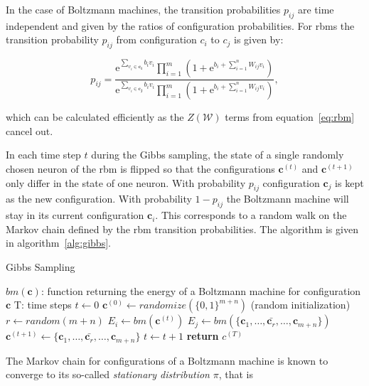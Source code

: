 In the case of Boltzmann machines, the transition probabilities $p_{ij}$ are time independent and 
given by the ratios of configuration probabilities. For \gls{rbm}s the transition probability $p_{ij}$ 
from configuration $c_i$ to $c_j$ is given by:

\begin{equation}
    p_{ij} = \frac{\mathrm{e}^{\sum_{v_i \in \bm{c_i}}b_iv_i}\prod_{i=1}^m(1+\mathrm{e}^{b_i + \sum_{i=1}^nW_{ij}v_i})}{\mathrm{e}^{\sum_{v_i \in \bm{c_j}}b_iv_i}\prod_{i=1}^m(1+\mathrm{e}^{b_i + \sum_{i=1}^nW_{ij}v_i})},
\end{equation}

which can be calculated efficiently as the $Z(\mathcal{W})$ terms from equation~\ref{eq:rbm} cancel out.

In each time step $t$ during the Gibbs sampling, the state of a single randomly chosen neuron of the \gls{rbm} is flipped
so that the configurations $\bm{c}^{(t)}$ and $\bm{c}^{(t+1)}$ only differ in the state of one neuron. With 
probability $p_{ij}$ configuration $\bm{c}_j$ is kept as the new configuration. With probability
$1-p_{ij}$ the Boltzmann machine will stay in its current configuration $\bm{c}_i$. This corresponds to a random walk on the Markov chain defined by the \gls{rbm} transition probabilities. The algorithm is given in 
algorithm~\ref{alg:gibbs}.

\begin{algorithm}[H]
    \caption{Gibbs Sampling}
    \begin{algorithmic}[1]
        \Require $bm(\bm{c})$: function returning the energy of a Boltzmann machine for configuration $\bm{c}$
        \Require T: time steps
        \State $t\gets 0$
        \State $\bm{c}^{(0)} \gets randomize(\{0,1\}^{m+n})$ (random initialization)
        \Repeat
            \State $r \gets random(m+n)$
            \State $E_i \gets bm(\bm{c}^{(t)})$
            \State $E_j \gets bm(\{\bm{c}_1,\dots,\bar{\bm{c}_r},\dots,\bm{c}_{m+n}\})$
                \State $\bm{c}^{(t+1)} \gets \{\bm{c}_1,\dots,\bar{\bm{c}_r},\dots,\bm{c}_{m+n}\}$
            \EndIf
            \State $t\gets t+1$
        \State \textbf{return} $c^{(T)}$
    \end{algorithmic}
    \label{alg:gibbs}
\end{algorithm}

The Markov chain for configurations of a Boltzmann machine is known to converge to its so-called 
\textit{stationary distribution} $\pi$, that is

